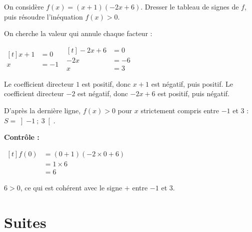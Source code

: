 \documentclass[10pt,a4paper]{article}
\begin{document}
\begin{bloc}
\begin{exple}
On considère \(f(x)=(x+1)(-2x+6)\). Dresser le tableau de signes de \(f\), puis résoudre l'inéquation \(f(x)>0\).

\smallskip
On cherche la valeur qui annule chaque facteur :

\smallskip
\(\begin{aligned}[t] x+1&=0\\ x&=-1\end{aligned}\) \qquad \(\begin{aligned}[t] -2x+6&=0\\ -2x&=-6\\ x&=3\end{aligned}\)

\smallskip
Le coefficient directeur \(1\) est positif, donc \(x+1\) est négatif, puis positif. Le coefficient directeur \(-2\) est négatif, donc \(-2x+6\) est positif, puis négatif.
\begin{center}
\end{center}
D'après la dernière ligne, \(f(x)>0\) pour \(x\) strictement compris entre \(-1\) et \(3\) : \(S=\left]-1\ ;\ 3\right[\).

\textbf{Contrôle :}

\smallskip
\(\begin{aligned}[t] f(0)&=(0+1)(-2\times 0+6)\\ &=1\times 6\\ &=6\end{aligned}\)

\smallskip
\(6>0\), ce qui est cohérent avec le signe \(+\) entre \(-1\) et \(3\).
\end{exple}
\end{bloc}

\section{Suites} \label{annexe-suites}
\end{document}
